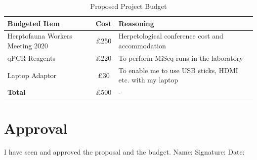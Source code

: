 \documentclass[11pt, a4paper, titlepage]{article}
\begin{document}
\begin{table}[h!]
	\small
	\begin{tabular} {| l | c | l |}  \hline
		\textbf{Budgeted Item} & \textbf{Cost} & \textbf{Reasoning} \\ \hline
		Herptofauna Workers Meeting 2020 & £250 & Herpetological conference cost and accommodation \\ \hline
		qPCR Reagents & £220 & To perform MiSeq runs in the laboratory \\ \hline
		Laptop Adaptor & £30 & To enable me to use USB sticks, HDMI etc. with my laptop \\ \hline
		\textbf{Total} & £500  & - \\ \hline
	\end{tabular}
	\caption{Proposed Project Budget}
\end{table}

\newpage

\printbibliography

\newpage

\section{Approval}

I have seen and approved the proposal and the budget. 
\newline
\newline
\newline
\noindent Name:
\newline
\newline
\newline
\newline
Signature:
\newline
\newline
\newline
\newline
Date:
\end{document}

